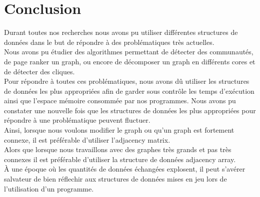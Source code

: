 \documentclass[a4paper,10pt]{report}
\begin{document}
\chapter{Conclusion}
Durant toutes nos recherches nous avons pu utiliser différentes structures de données dans le but de répondre à des problématiques très actuelles. 
\\
Nous avons pu étudier des algorithmes permettant de détecter des communautés, de page ranker un graph, ou encore de décomposer un graph en différents cores et de détecter des cliques.
\\
\newline
Pour répondre à toutes ces problématiques, nous avons dû utiliser les structures de données les plus appropriées afin de garder sous contrôle les temps d'exécution ainsi que l'espace mémoire consommée par nos programmes.
\newline
Nous avons pu constater une nouvelle fois que les structures de données les plus appropriées pour répondre à une problématique peuvent fluctuer.
\\
Ainsi, lorsque nous voulons modifier le graph ou qu'un graph est fortement connexe, il est préférable d'utiliser l'adjacency matrix.\\
Alors que lorsque nous travaillons avec des graphes très grands et pas très connexes il est préférable d'utiliser la structure de données adjacency array.
\newline
\\
À une époque où les quantités de données échangées explosent, il peut s'avérer salvateur de bien réflechir aux structures de données mises en jeu lors de l'utilisation d'un programme.
\end{document}
